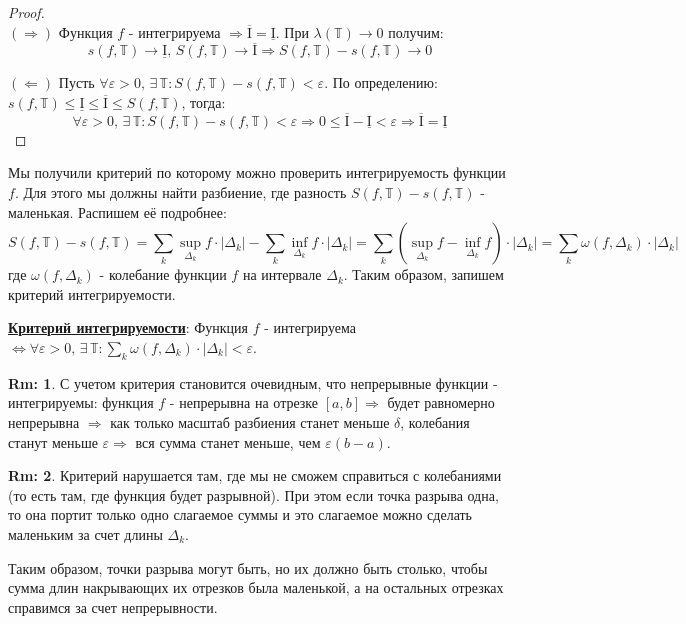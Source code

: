 \documentclass[12pt]{article}
\newcommand{\MTB}{\mathbb{T}}
\newcommand{\MI}{\mathrm{I}}
\newcommand{\VE}{\varepsilon}
\theoremstyle{definition}
\newtheorem{rem}{Rm:}
\begin{document}
\begin{proof}\hfill\\
	$(\Rightarrow)$ Функция $f$ - интегрируема $\Rightarrow \overline{\MI} = \underline{\MI}$. При $\lambda(\MTB) \to 0$ получим:
	$$
		s(f,\MTB) \to \underline{\MI},\, S(f,\MTB) \to \overline{\MI} \Rightarrow S(f,\MTB) - s(f,\MTB) \to 0 
	$$

	$(\Leftarrow)$ Пусть $\forall \VE > 0, \, \exists \, \MTB \colon S(f,\MTB) - s(f,\MTB) < \VE$. По определению: $s(f,\MTB) \leq \underline{\MI} \leq \overline{\MI} \leq S(f,\MTB)$, тогда:
	$$
		\forall \VE > 0, \, \exists \, \MTB \colon S(f,\MTB) - s(f,\MTB) < \VE \Rightarrow 0 \leq \overline{\MI} - \underline{\MI} < \VE \Rightarrow  \overline{\MI} = \underline{\MI}
	$$
\end{proof}

Мы получили критерий по которому можно проверить интегрируемость функции $f$. Для этого мы должны найти разбиение, где разность $S(f,\MTB) - s(f,\MTB)$ - маленькая. Распишем её подробнее:
$$
	S(f,\MTB) - s(f,\MTB) = \sum\limits_{k} \sup\limits_{\Delta_k}f{\cdot}|\Delta_k| - \sum\limits_{k}\inf\limits_{\Delta_k}f{\cdot}|\Delta_k| = \sum\limits_{k}\left(\sup\limits_{\Delta_k}f - \inf\limits_{\Delta_k}f\right){\cdot} |\Delta_k| = \sum\limits_{k}\omega(f,\Delta_k){\cdot} |\Delta_k|
$$
где $\omega(f,\Delta_k)$ - колебание функции $f$ на интервале $\Delta_k$. Таким образом, запишем критерий интегрируемости.

\textbf{\uline{Критерий интегрируемости}}: Функция $f$ - интегрируема $\Leftrightarrow \forall \VE > 0, \, \exists \, \MTB \colon \sum\limits_{k}\omega(f,\Delta_k){\cdot} |\Delta_k| < \VE$.

\begin{rem}
	С учетом критерия становится очевидным, что непрерывные функции - интегрируемы: функция $f$ - непрерывна на отрезке $[a,b] \Rightarrow$ будет равномерно непрерывна $\Rightarrow$ как только масштаб разбиения станет меньше $\delta$, колебания станут меньше $\VE \Rightarrow$ вся сумма станет меньше, чем $\VE(b-a)$.
\end{rem}
\begin{rem}
	Критерий нарушается там, где мы не сможем справиться с колебаниями (то есть там, где функция будет разрывной). При этом если точка разрыва одна, то она портит только одно слагаемое суммы и это слагаемое можно сделать маленьким за счет длины $\Delta_k$. 
\end{rem}

Таким образом, точки разрыва могут быть, но их должно быть столько, чтобы сумма длин накрывающих их отрезков была маленькой, а на остальных отрезках справимся за счет непрерывности. 
\end{document}

